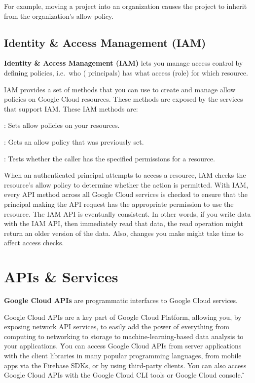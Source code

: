 \be
For example, moving a project into an organization causes the project to inherit from the organization's allow policy.
\ee

\subsection{Identity \& Access Management (IAM)}

\textbf{Identity \& Access Management (IAM)} lets you manage access control by defining policies, i.e.\ who (
principals) has what access (role) for which resource.
\ed

IAM provides a set of methods that you can use to create and manage allow policies on Google Cloud resources. These
methods are exposed by the services that support IAM. These IAM methods are:
\bit
\item {}: Sets allow policies on your resources.
\item {}: Gets an allow policy that was previously set.
\item {}: Tests whether the caller has the specified permissions for a resource.
\eit

When an authenticated principal attempts to access a resource, IAM checks the resource's allow policy to determine
whether the action is permitted. With IAM, every API method across all Google Cloud services is checked to ensure
that the principal making the API request has the appropriate permission to use the resource. The IAM API is
eventually consistent. In other words, if you write data with the IAM API, then immediately read that data, the read
operation might return an older version of the data. Also, changes you make might take time to affect access checks.

\section{APIs \& Services}

\textbf{Google Cloud APIs} are programmatic interfaces to Google Cloud services.
\ed

Google Cloud APIs are a key part of Google Cloud Platform, allowing you, by exposing network API services, to easily
add the power of everything from computing to networking to storage to machine-learning-based data analysis to your
applications. \v

You can access Google Cloud APIs from server applications with the client libraries in many popular programming
languages, from mobile apps via the Firebase SDKs, or by using third-party clients. You can also access Google Cloud
APIs with the Google Cloud CLI tools or Google Cloud console. \v

